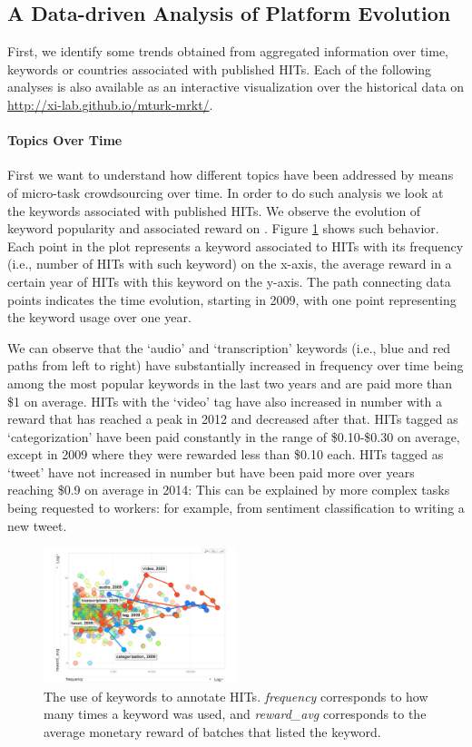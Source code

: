 \subsection{A Data-driven Analysis of Platform Evolution}
First, we identify some trends obtained from aggregated information over time, keywords or countries associated with published HITs.  Each of the following analyses is also available as an interactive visualization over the historical data on \url{http://xi-lab.github.io/mturk-mrkt/}.
\paragraph{Topics  Over Time}
First we want to understand how different topics have been addressed by means of micro-task crowdsourcing over time.
In order to do such analysis we look at the keywords associated with published HITs. We observe the evolution of keyword popularity and associated reward on \amt{}. 
Figure \ref{fig:tagEvolution} shows such behavior. Each point in the plot represents a keyword associated to HITs with its frequency (i.e., number of HITs with such keyword) on the x-axis, the average reward in a certain year of HITs with this keyword on the y-axis. The path connecting data points indicates the time evolution, starting in 2009, with one point representing the keyword usage over one year.

We can observe that the `audio' and `transcription' keywords (i.e., blue and red paths from left to right) have substantially increased in frequency over time being among the most popular keywords in the last two years and are paid more than \$1 on average.
HITs with the `video' tag have also increased in number with a reward that has reached a peak in 2012 and decreased after that.
HITs tagged as `categorization' have been paid constantly in the range of \$0.10-\$0.30 on average, except in 2009 where they were rewarded less than \$0.10 each.
HITs tagged as `tweet' have not increased in number but have been paid more over years reaching \$0.9 on average in 2014: This can be explained by more complex tasks being requested to workers: for example, from sentiment classification to writing a new tweet.

\begin{figure}[ht]
	\centering
		\includegraphics[width=0.5\textwidth]{figures/tagEvolution}
	\caption{The use of keywords to annotate HITs. \emph{frequency} corresponds to how many times a keyword was used, and \emph{reward_avg} corresponds to the average monetary reward of batches that listed the keyword.}
	\label{fig:tagEvolution}
\end{figure}

